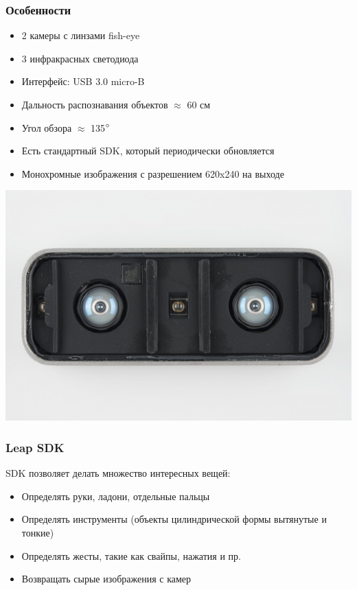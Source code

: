 \documentclass{beamer}
\begin{document}
		\begin{frame}
			\frametitle{Особенности}
			
			\begin{itemize}
				\item 2 камеры с линзами fish-eye
				\item 3 инфракрасных светодиода
				\item Интерфейс: USB 3.0 micro-B
				\item Дальность распознавания объектов $\approx$ 60 см
				\item Угол обзора $\approx$ 135$\degree$
				\item Есть стандартный SDK, который периодически обновляется
				\item Монохромные изображения с разрешением 620x240 на выходе
			\end{itemize}
			
			\begin{center}
				\includegraphics[scale=0.25]{images/LeapMotionDisassembled}
			\end{center}
		\end{frame}
		
		\begin{frame}
			\frametitle{Leap SDK}
			
			SDK позволяет делать множество интересных вещей:
			\begin{itemize}
				\item Определять руки, ладони, отдельные пальцы
				\item Определять инструменты (объекты цилиндрической формы вытянутые и тонкие)
				\item Определять жесты, такие как свайпы, нажатия и пр.
				\item Возвращать сырые изображения с камер
			\end{itemize}
		\end{frame}
		
\end{document}
